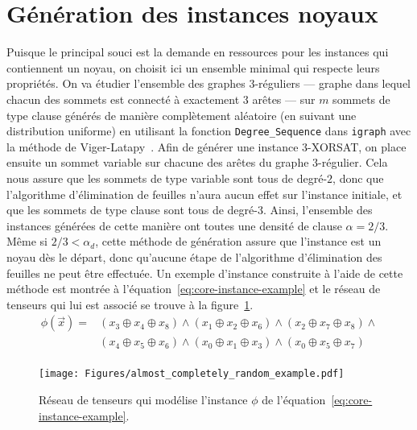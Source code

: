 \section{Génération des instances noyaux}\label{sec:core-instances}
Puisque le principal souci est la demande en ressources pour les instances qui contiennent un noyau, on choisit ici un ensemble minimal qui respecte leurs propriétés.
On va étudier l'ensemble des graphes $3$-réguliers --- graphe dans lequel chacun des sommets est connecté à exactement $3$ arêtes --- sur $m$ sommets de type clause générés de manière complètement aléatoire (en suivant une distribution uniforme) en utilisant la fonction \verb|Degree_Sequence| dans \verb|igraph| avec la méthode de Viger-Latapy~\cite{viger_efficient_2016}.
Afin de générer une instance $3$-XORSAT, on place ensuite un sommet variable sur chacune des arêtes du graphe $3$-régulier.
Cela nous assure que les sommets de type variable sont tous de degré-$2$, donc que l'algorithme d'élimination de feuilles n'aura aucun effet sur l'instance initiale, et que les sommets de type clause sont tous de degré-$3$.
Ainsi, l'ensemble des instances générées de cette manière ont toutes une densité de clause $\alpha = 2/3$.
Même si $2/3 < \alpha_d$, cette méthode de génération assure que l'instance est un noyau dès le départ, donc qu'aucune étape de l'algorithme d'élimination des feuilles ne peut être effectuée.
Un exemple d'instance construite à l'aide de cette méthode est montrée à l'équation~\ref{eq:core-instance-example} et le réseau de tenseurs qui lui est associé se trouve à la figure~\ref{fig:core-instance-example}.
\begin{equation}\label{eq:core-instance-example}
    \begin{split}
        \phi(\vec{x}) = &(x_3 \oplus x_4 \oplus x_8) \wedge (x_1 \oplus x_2 \oplus x_6) \wedge (x_2 \oplus x_7 \oplus x_8) \wedge\\
        &(x_4 \oplus x_5 \oplus x_6) \wedge (x_0 \oplus x_1 \oplus x_3) \wedge (x_0 \oplus x_5 \oplus x_7)\\
    \end{split}
  \end{equation}
\begin{figure}[h]
    \centering
    \texttt{[image: Figures/almost\_completely\_random\_example.pdf]}
    \caption{Réseau de tenseurs qui modélise l'instance $\phi$ de l'équation~\ref{eq:core-instance-example}.}
    \label{fig:core-instance-example}
\end{figure}

